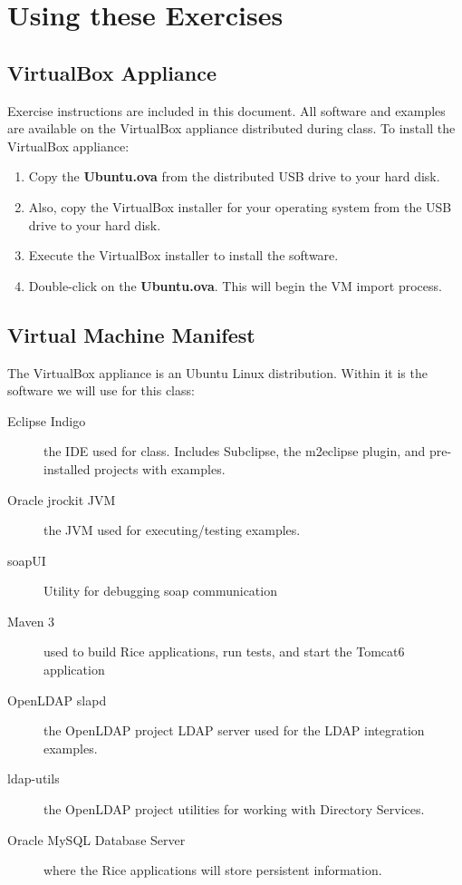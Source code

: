 \documentclass[letterpaper,notitlepage,12pt]{book}
\begin{document}
\section*{Using these Exercises}
\subsection*{VirtualBox Appliance}
Exercise instructions are included in this document. All software and
examples are available on the VirtualBox appliance distributed during
class. To install the VirtualBox appliance:
\begin{enumerate}
  \item Copy the \textbf{Ubuntu.ova} from the distributed USB drive to
    your hard disk.
  \item Also, copy the VirtualBox installer for your operating system
    from the USB drive to your hard disk.
  \item Execute the VirtualBox installer to install the software.
  \item Double-click on the \textbf{Ubuntu.ova}. This will begin the
    VM import process.
\end{enumerate}

\subsection*{Virtual Machine Manifest}
The VirtualBox appliance is an Ubuntu Linux distribution. Within it is
the software we will use for this class:
\begin{description}
  \item [Eclipse Indigo] the IDE used for class. Includes Subclipse,
    the m2eclipse plugin, and pre-installed projects with examples.
  \item [Oracle jrockit JVM] the JVM used for executing/testing
    examples.
  \item [soapUI] Utility for debugging soap communication
  \item [Maven 3] used to build Rice applications, run tests, and
    start the Tomcat6 application
  \item [OpenLDAP slapd] the OpenLDAP project LDAP server used for the
    LDAP integration examples.
  \item [ldap-utils] the OpenLDAP project utilities for working with
    Directory Services.
  \item [Oracle MySQL Database Server] where the Rice applications
    will store persistent information.
\end{description}
\end{document}
